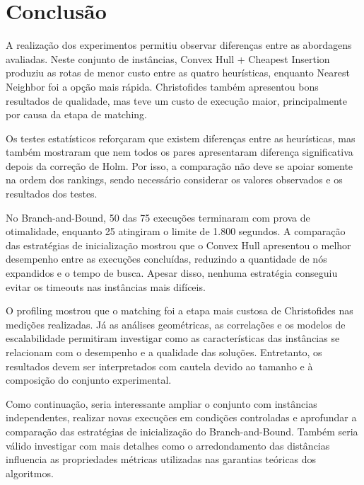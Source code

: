 \documentclass[12pt]{article}
\begin{document}
\section{Conclusão}

A realização dos experimentos permitiu observar diferenças entre as abordagens avaliadas. Neste conjunto de instâncias, Convex Hull + Cheapest Insertion produziu as rotas de menor custo entre as quatro heurísticas, enquanto Nearest Neighbor foi a opção mais rápida. Christofides também apresentou bons resultados de qualidade, mas teve um custo de execução maior, principalmente por causa da etapa de matching.

Os testes estatísticos reforçaram que existem diferenças entre as heurísticas, mas também mostraram que nem todos os pares apresentaram diferença significativa depois da correção de Holm. Por isso, a comparação não deve se apoiar somente na ordem dos rankings, sendo necessário considerar os valores observados e os resultados dos testes.

No Branch-and-Bound, 50 das 75 execuções terminaram com prova de otimalidade, enquanto 25 atingiram o limite de 1.800 segundos. A comparação das estratégias de inicialização mostrou que o Convex Hull apresentou o melhor desempenho entre as execuções concluídas, reduzindo a quantidade de nós expandidos e o tempo de busca. Apesar disso, nenhuma estratégia conseguiu evitar os timeouts nas instâncias mais difíceis.

O profiling mostrou que o matching foi a etapa mais custosa de Christofides nas medições realizadas. Já as análises geométricas, as correlações e os modelos de escalabilidade permitiram investigar como as características das instâncias se relacionam com o desempenho e a qualidade das soluções. Entretanto, os resultados devem ser interpretados com cautela devido ao tamanho e à composição do conjunto experimental.

Como continuação, seria interessante ampliar o conjunto com instâncias independentes, realizar novas execuções em condições controladas e aprofundar a comparação das estratégias de inicialização do Branch-and-Bound. Também seria válido investigar com mais detalhes como o arredondamento das distâncias influencia as propriedades métricas utilizadas nas garantias teóricas dos algoritmos.
\end{document}
